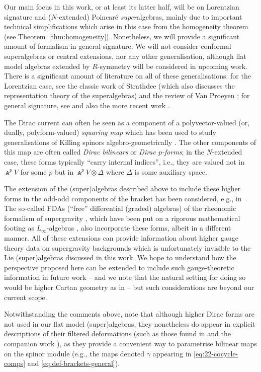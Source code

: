 Our main focus in this work, or at least its latter half, will be on Lorentzian signature and ($N$-extended) Poincar\'e \emph{super}algebras, mainly due to important technical simplifications which arise in this case from the homogeneity theorem (see Theorem~\ref{thm:homogeneity}). Nonetheless, we will provide a significant amount of formalism in general signature. We will not consider conformal superalgebras or central extensions, nor any other generalisation, although flat model algebras extended by $R$-symmetry will be considered in upcoming work. There is a significant amount of literature on all of these generalisations: for the Lorentzian case, see the classic work of Strathdee (which also discusses the representation theory of the superalgebras) \cite{Strathdee1986} and the review of Van Proeyen \cite{VanProeyen1999}; for general signature, see \cite{Alekseevsky1997,Alekseevsky2005,DAuria2001_1} and also the more recent work \cite{Gall2021}.

\begin{Remark}
	The Dirac current can often be seen as a component of a polyvector-valued (or, dually, polyform-valued) \emph{squaring map} which has been used to study generalisations of Killing spinors algebro-geometrically \cite{Cortes2021}. The other components of this map are often called \emph{Dirac bilinears} or \emph{Dirac $p$-forms}; in the $N$-extended case, these forms typically ``carry internal indices'', i.e., they are valued not in $\Wedge^p V$ for some $p$ but in $\Wedge^p V\otimes\Delta$ where $\Delta$ is some auxiliary space.
	
	The extension of the (super)algebras described above to include these higher forms in the odd-odd components of the bracket has been considered, e.g., in~\cite{Alekseevsky2005,Figueroa-OFarrill2009}. The so-called FDAs (``free'' differential (graded) algebras) of the rheonomic formalism of supergravity \cite{DAuria1982,DAuria1980}, which have been put on a rigorous mathematical footing as $L_\infty$-algebras \cite{Schreiber2015,Schreiber2009,Stasheff2018}, also incorporate these forms, albeit in a different manner.
	All of these extensions can provide information about higher gauge theory data on supergravity backgrounds which is unfortunately invisible to the Lie (super)algebras discussed in this work. We hope to understand how the perspective proposed here can be extended to include such gauge-theoretic information in future work -- and we note that the natural setting for doing so would be higher Cartan geometry as in \cite{Schreiber2009} -- but such considerations are beyond our current scope.
	
	Notwithstanding the comments above, note that although higher Dirac forms are not used in our flat model (super)algebras, they nonetheless do appear in explicit descriptions of their filtered deformations (such as those found in \cite{Beckett2019,deMedeiros2016,deMedeiros2018,Figueroa-OFarrill2017} and the companion work \cite{Beckett2024_3}), as they provide a convenient way to parametrise bilinear maps on the spinor module (e.g., the maps denoted $\gamma$ appearing in \eqref{eq:22-cocycle-comps} and \eqref{eq:def-brackets-general}).
\end{Remark}

